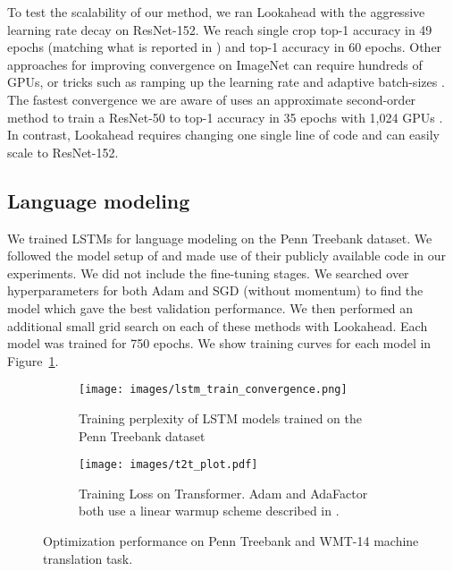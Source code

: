 \documentclass{article}
\begin{document}
To test the scalability of our method, we ran Lookahead with the aggressive learning rate decay on ResNet-152. We reach  single crop top-1 accuracy in 49 epochs (matching what is reported in \citet{he2016deep}) and  top-1 accuracy in 60 epochs. Other approaches for improving convergence on ImageNet can require hundreds of GPUs, or tricks such as ramping up the learning rate and adaptive batch-sizes \citep{goyal2017accurate, jia2018highly}. The fastest convergence we are aware of uses an approximate second-order method to train a ResNet-50 to  top-1 accuracy in 35 epochs with 1,024 GPUs \citep{1811.12019}. In contrast, Lookahead requires changing one single line of code and can easily scale to ResNet-152.  \subsection{Language modeling}
\label{sec:lm}

We trained LSTMs \citep{hochreiter1997long} for language modeling on the Penn Treebank dataset. We followed the model setup of \citet{merity2017regularizing} and made use of their publicly available code in our experiments. We did not include the fine-tuning stages. We searched over hyperparameters for both Adam and SGD (without momentum) to find the model which gave the best validation performance. We then performed an additional small grid search on each of these methods with Lookahead. Each model was trained for 750 epochs. We show training curves for each model in Figure~\ref{fig:lstm-train}.

\begin{figure}[t]
\begin{subfigure}{0.45 \textwidth}
\centering
    \vskip -0.1in
    \texttt{[image: images/lstm\_train\_convergence.png]}
    \caption{Training perplexity of LSTM models trained on the Penn Treebank dataset}
    \label{fig:lstm-train}
\end{subfigure}
\hfill
\hspace{0.05in}
\begin{subfigure}{0.45 \textwidth}
    \centering
    \texttt{[image: images/t2t\_plot.pdf]}
    \caption{Training Loss on Transformer. Adam and AdaFactor both use a linear warmup scheme described in \citet{vaswani2017attention}.}
    \label{fig:nmt}
\end{subfigure}
\caption{Optimization performance on Penn Treebank and WMT-14 machine translation task.}
\end{figure}
\end{document}
